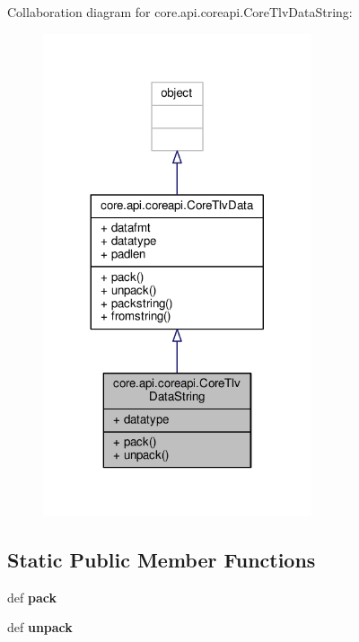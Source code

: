 Collaboration diagram for core.\+api.\+coreapi.\+Core\+Tlv\+Data\+String\+:
\nopagebreak
\begin{figure}[H]
\begin{center}
\leavevmode
\includegraphics[width=224pt]{classcore_1_1api_1_1coreapi_1_1_core_tlv_data_string__coll__graph}
\end{center}
\end{figure}
\subsection*{Static Public Member Functions}
\begin{DoxyCompactItemize}
\item 
\hypertarget{classcore_1_1api_1_1coreapi_1_1_core_tlv_data_string_a64d9f0e606d3fb961a869161e05d5932}{def {\bfseries pack}}\label{classcore_1_1api_1_1coreapi_1_1_core_tlv_data_string_a64d9f0e606d3fb961a869161e05d5932}

\item 
\hypertarget{classcore_1_1api_1_1coreapi_1_1_core_tlv_data_string_aca46e66d9cd742fd7748d2104523ed15}{def {\bfseries unpack}}\label{classcore_1_1api_1_1coreapi_1_1_core_tlv_data_string_aca46e66d9cd742fd7748d2104523ed15}

\end{DoxyCompactItemize}
